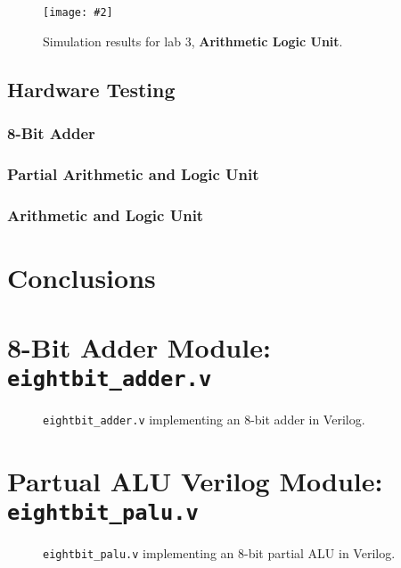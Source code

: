 \documentclass[12pt, letterpaper]{article}
\newcommand{\InsertImage}[3][\linewidth]{
	\begin{figure}[h]
		\centering
		\texttt{[image: \#2]}
		\caption{#3}
	\end{figure}
}
\newcommand{\InsertImageHere}[3][\linewidth]{
	\FloatBarrier
	\InsertImage[#1]{#2}{#3}
	\FloatBarrier
}
\begin{document}
\InsertImageHere{images/simulations/lab3/simulation.png}{Simulation results for lab 3, \textbf{Arithmetic Logic Unit}.}


\subsection{Hardware Testing}


\subsubsection{8-Bit Adder}

\subsubsection{Partial Arithmetic and Logic Unit}

\subsubsection{Arithmetic and Logic Unit}




\newpage
\section{Conclusions}




\newpage
\appendix
\appendixpage
\addappheadtotoc 


\section{8-Bit Adder Module: \texttt{eightbit\_adder.v}}
\FloatBarrier
\begin{figure}[h]
	
	\caption{\texttt{eightbit\_adder.v} implementing an 8-bit adder in Verilog.}
\end{figure}
\FloatBarrier


\newpage
\section{Partual ALU Verilog Module: \texttt{eightbit\_palu.v}}
\FloatBarrier
\begin{figure}[h]
	
	\caption{\texttt{eightbit\_palu.v} implementing an 8-bit partial ALU in Verilog.}
\end{figure}
\FloatBarrier
\end{document}
